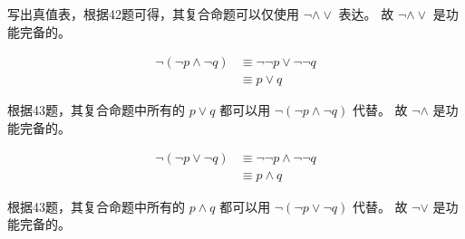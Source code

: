 {{        %
        \begin{practices}
            写出真值表，根据42题可得，其复合命题可以仅使用 $\neg \wedge \vee$ 表达。
            故 $\neg \wedge \vee$ 是功能完备的。
        \end{practices}

        \begin{practices}
            \begin{align*}
                \neg (\neg p \wedge \neg q)
                &\equiv \neg \neg p \vee \neg \neg q \\
                &\equiv p \vee q
            \end{align*}

            根据43题，其复合命题中所有的 $p \vee q$ 都可以用 $\neg (\neg p \wedge \neg q)$ 代替。
            故 $\neg \wedge$ 是功能完备的。
        \end{practices}

        \begin{practices}
            \begin{align*}
                \neg (\neg p \vee \neg q)
                &\equiv \neg \neg p \wedge \neg \neg q \\
                &\equiv p \wedge q
            \end{align*}

            根据43题，其复合命题中所有的 $p \wedge q$ 都可以用 $\neg (\neg p \vee \neg q)$ 代替。
            故 $\neg \vee$ 是功能完备的。
        \end{practices}
    }
}

